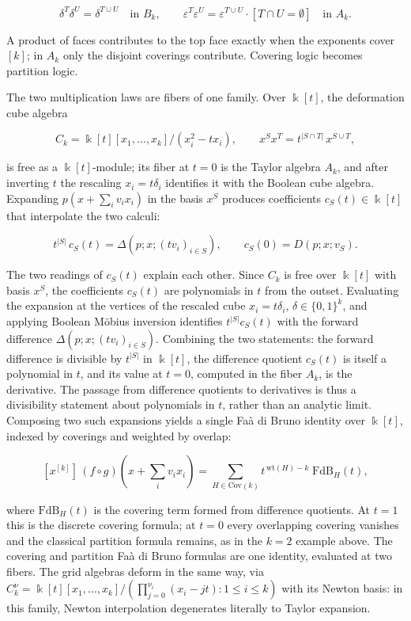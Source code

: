 \documentclass[10pt,a4paper]{article}
\theoremstyle{plain}
\theoremstyle{definition}
\newcommand{\ik}{\Bbbk} %
\newcommand{\1}{\mathbb{1}} %
\newcommand{\set}[1]{\{#1\}} %
\newcommand{\eps}{\varepsilon} %
\newcommand{\Cov}{\mathrm{Cov}} %
\begin{document}
\[
  \delta^T \delta^U = \delta^{T \cup U} \quad \text{in } B_k,
  \qquad
  \eps^T \eps^U = \eps^{T \cup U} \cdot [T \cap U = \emptyset]
  \quad \text{in } A_k.
\]

A product of faces contributes to the top face exactly when the
exponents cover \([k]\); in \(A_k\) only the disjoint coverings
contribute. Covering logic becomes partition logic.

The two multiplication laws are fibers of one family. Over \(\ik[t]\),
the deformation cube algebra

\[
  C_k = \ik[t][x_1, \dots, x_k]/(x_i^2 - t x_i), \qquad x^S x^T = t^{|S \cap T|}\, x^{S \cup T},
\]

is free as a \(\ik[t]\)-module; its fiber at \(t = 0\) is the Taylor
algebra \(A_k\), and after inverting \(t\) the rescaling
\(x_i = t \delta_i\) identifies it with the Boolean cube algebra.
Expanding \(p(x + \sum_i v_i x_i)\) in the basis \(x^S\) produces
coefficients \(c_S(t) \in \ik[t]\) that interpolate the two calculi:

\[
  t^{|S|}\, c_S(t) = \Delta(p; x; (t v_i)_{i \in S}), \qquad c_S(0) = D(p; x; v_S).
\]

The two readings of \(c_S(t)\) explain each other. Since \(C_k\) is free
over \(\ik[t]\) with basis \(x^S\), the coefficients \(c_S(t)\) are
polynomials in \(t\) from the outset. Evaluating the expansion at the
vertices of the rescaled cube \(x_i = t \delta_i\),
\(\delta \in \set{0,1}^k\), and applying Boolean Möbius inversion
identifies \(t^{|S|} c_S(t)\) with the forward difference
\(\Delta(p; x; (t v_i)_{i \in S})\). Combining the two statements: the
forward difference is divisible by \(t^{|S|}\) in \(\ik[t]\), the
difference quotient \(c_S(t)\) is itself a polynomial in \(t\), and its
value at \(t = 0\), computed in the fiber \(A_k\), is the derivative.
The passage from difference quotients to derivatives is thus a
divisibility statement about polynomials in \(t\), rather than an
analytic limit. Composing two such expansions yields a single Faà di
Bruno identity over \(\ik[t]\), indexed by coverings and weighted by
overlap:

\[
  [x^{[k]}]\, (f \circ g)(x + {\textstyle\sum_i} v_i x_i) = \sum_{H \in \Cov(k)} t^{\,\mathrm{wt}(H) - k}\; \mathrm{FdB}_H(t),
\]

where \(\mathrm{FdB}_H(t)\) is the covering term formed from difference
quotients. At \(t = 1\) this is the discrete covering formula; at
\(t = 0\) every overlapping covering vanishes and the classical
partition formula remains, as in the \(k = 2\) example above. The
covering and partition Faà di Bruno formulas are one identity, evaluated
at two fibers. The grid algebras deform in the same way, via
\(C_k^\nu = \ik[t][x_1, \dots, x_k]/(\prod_{j=0}^{\nu_i}(x_i - jt) : 1 \leq i \leq k)\)
with its Newton basis: in this family, Newton interpolation degenerates
literally to Taylor expansion.
\end{document}

